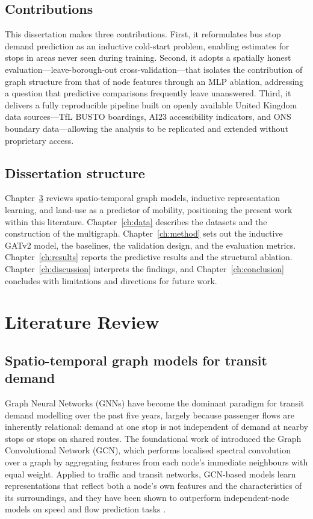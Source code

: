 \documentclass[12pt,a4paper]{report}
\begin{document}
\section{Contributions}
This dissertation makes three contributions. First, it reformulates bus stop
demand prediction as an inductive cold-start problem, enabling estimates for
stops in areas never seen during training. Second, it adopts a spatially honest
evaluation---leave-borough-out cross-validation---that isolates the contribution
of graph structure from that of node features through an MLP ablation, addressing
a question that predictive comparisons frequently leave unanswered. Third, it
delivers a fully reproducible pipeline built on openly available United Kingdom
data sources---TfL BUSTO boardings, AI23 accessibility indicators, and ONS
boundary data---allowing the analysis to be replicated and extended without
proprietary access.

\section{Dissertation structure}
Chapter~\ref{ch:litreview} reviews spatio-temporal graph models, inductive
representation learning, and land-use as a predictor of mobility, positioning
the present work within this literature. Chapter~\ref{ch:data} describes the
datasets and the construction of the multigraph. Chapter~\ref{ch:method} sets
out the inductive GATv2 model, the baselines, the validation design, and the
evaluation metrics. Chapter~\ref{ch:results} reports the predictive results and
the structural ablation. Chapter~\ref{ch:discussion} interprets the findings,
and Chapter~\ref{ch:conclusion} concludes with limitations and directions for
future work.


\chapter{Literature Review}
\label{ch:litreview}

\section{Spatio-temporal graph models for transit demand}
Graph Neural Networks (GNNs) have become the dominant paradigm for transit
demand modelling over the past five years, largely because passenger flows
are inherently relational: demand at one stop is not independent of demand
at nearby stops or stops on shared routes. The foundational work of
\citet{kipf2017semi} introduced the Graph Convolutional Network (GCN), which
performs localised spectral convolution over a graph by aggregating features
from each node's immediate neighbours with equal weight. Applied to traffic
and transit networks, GCN-based models learn representations that reflect
both a node's own features and the characteristics of its surroundings, and
they have been shown to outperform independent-node models on speed and flow
prediction tasks \citep{kipf2017semi}.
\end{document}
